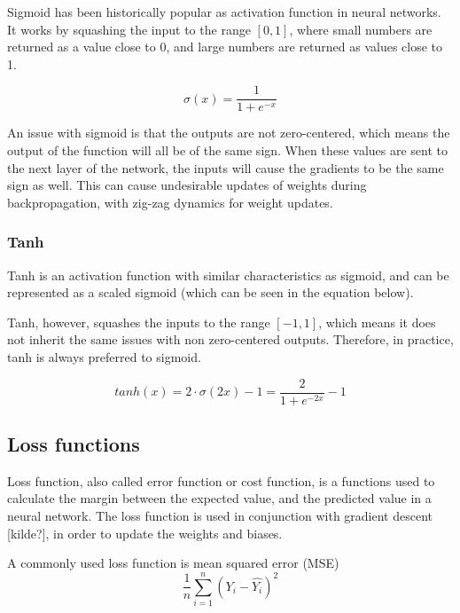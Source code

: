 Sigmoid has been historically popular as activation function in neural networks. It works by squashing the input to the range $[0, 1]$, where small numbers are returned as a value close to 0, and large numbers are returned as values close to 1. 

\begin{equation} \label{eqn:sigmoid}
    \sigma(x) = \frac{1}{1 + e^{-x}}
\end{equation}

An issue with sigmoid is that the outputs are not zero-centered, which means the output of the function will all be of the same sign. When these values are sent to the next layer of the network, the inputs will cause the gradients to be the same sign as well. This can cause undesirable updates of weights during backpropagation, with zig-zag dynamics for weight updates. \cite{_neural_2018}

\subsubsection{Tanh}

Tanh is an activation function with similar characteristics as sigmoid, and can be represented as a scaled sigmoid (which can be seen in the equation below).

Tanh, however, squashes the inputs to the range $[-1, 1]$, which means it does not inherit the same issues with non zero-centered outputs. Therefore, in practice, tanh is always preferred to sigmoid. \cite{_neural_2018}

\begin{equation} \label{eqn:tanh}
    tanh(x) = 2 \cdot \sigma(2x) - 1 = \frac{2}{1+e^{-2x}} -1
\end{equation}

\subsection{Loss functions}
\label{loss_function}

Loss function, also called error function or cost function, is a functions used to calculate the margin between the expected value, and the predicted value in a neural network. The loss function is used in conjunction with gradient descent [kilde?], in order to update the weights and biases.

A commonly used loss function is mean squared error (MSE)
\begin{equation}
    \frac{1}{n} \sum^n_{i=1} (Y_i - \hat{Y_i})^2
\end{equation}

